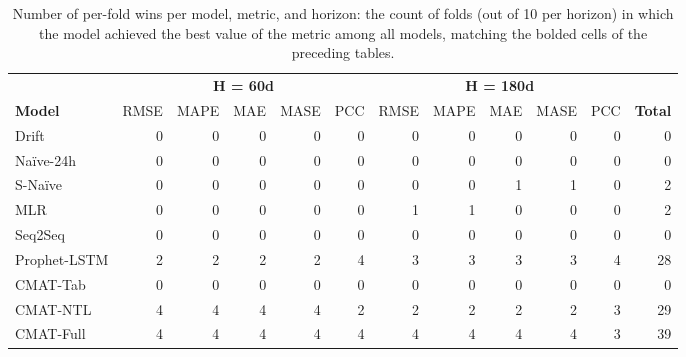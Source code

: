 \begingroup\small\setlength{\tabcolsep}{4pt}
\begin{table}[h]
\centering
\caption{Number of per-fold wins per model, metric, and horizon: the count of folds (out of 10 per horizon) in which the model achieved the best value of the metric among all models, matching the bolded cells of the preceding tables.}
\label{tab:model_wins}
\begin{tabular}{l r r r r r r r r r r r}
\toprule
 & \multicolumn{5}{c}{\textbf{H = 60d}} & \multicolumn{5}{c}{\textbf{H = 180d}} & \\
\cmidrule(lr){2-6} \cmidrule(lr){7-11} 
\textbf{Model} & RMSE & MAPE & MAE & MASE & PCC & RMSE & MAPE & MAE & MASE & PCC & \textbf{Total} \\
\midrule
Drift & 0 & 0 & 0 & 0 & 0 & 0 & 0 & 0 & 0 & 0 & 0 \\
Na\"ive-24h & 0 & 0 & 0 & 0 & 0 & 0 & 0 & 0 & 0 & 0 & 0 \\
S-Na\"ive & 0 & 0 & 0 & 0 & 0 & 0 & 0 & 1 & 1 & 0 & 2 \\
MLR & 0 & 0 & 0 & 0 & 0 & 1 & 1 & 0 & 0 & 0 & 2 \\
Seq2Seq & 0 & 0 & 0 & 0 & 0 & 0 & 0 & 0 & 0 & 0 & 0 \\
Prophet-LSTM & 2 & 2 & 2 & 2 & 4 & 3 & 3 & 3 & 3 & 4 & 28 \\
CMAT-Tab & 0 & 0 & 0 & 0 & 0 & 0 & 0 & 0 & 0 & 0 & 0 \\
CMAT-NTL & 4 & 4 & 4 & 4 & 2 & 2 & 2 & 2 & 2 & 3 & 29 \\
CMAT-Full & 4 & 4 & 4 & 4 & 4 & 4 & 4 & 4 & 4 & 3 & 39 \\
\bottomrule
\end{tabular}
\end{table}
\endgroup

\clearpage
